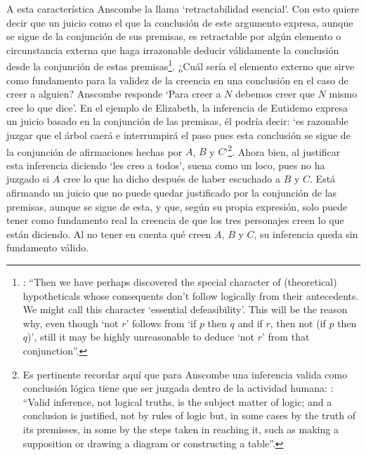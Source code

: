 A esta característica Anscombe la llama `retractabilidad esencial'. Con esto quiere decir que un juicio como el que la conclusión de este argumento expresa, aunque se sigue de la conjunción de sus premisas, es retractable por algún elemento o circunstancia externa que haga irrazonable deducir válidamente la conclusión desde la conjunción de estas premisas\footnote{\cite[Cf.][299]{anscombe2015logic:qpa}: \enquote{Then we have perhaps discovered the special character of (theoretical) hypotheticals whose consequents don't follow logically from their antecedents. We might call this character `essential defeasibility'. This will be the reason why, even though `not $r$' follows from `if $p$ then $q$ and if $r$, then not (if $p$ then $q$)', still it may be highly unreasonable to deduce `not $r$' from that conjunction}.}. ¿Cuál sería el elemento externo que sirve como fundamento para la validez de la creencia en una conclusión en el caso de creer a alguien? Anscombe responde \enquote*{Para creer a $N$ debemos creer que $N$ mismo cree lo que dice}. En el ejemplo de Elizabeth, la inferencia de Eutidemo expresa un juicio basado en la conjunción de las premisas, él podría decir: \enquote*{es razonable juzgar que el árbol caerá e interrumpirá el paso pues esta conclusión se sigue de la conjunción de afirmaciones hechas por $A$, $B$ y $C$}\footnote{Es pertinente recordar aquí que para Anscombe una inferencia valida como conclusión lógica tiene que ser juzgada dentro de la actividad humana: \cite[121]{anscombe1981parmenides:qli}: \enquote{Valid inference, not logical truths, is the subject matter of logic; and a conclusion is justified, not by rules of logic but, in some cases by the truth of its premisses, in some by the steps taken in reaching it, such as making a supposition or drawing a diagram or constructing a table}.}. Ahora bien, al justificar esta inferencia diciendo \enquote*{les creo a todos}, suena como un loco, pues no ha juzgado si $A$ cree lo que ha dicho después de haber escuchado a $B$ y $C$. Está afirmando un juicio que no puede quedar justificado por la conjunción de las premisas, aunque se sigue de esta, y que, según su propia expresión, solo puede tener como fundamento real la creencia de que los tres personajes creen lo que están diciendo. Al no tener en cuenta qué creen $A$, $B$ y $C$, su inferencia queda sin fundamento válido.

